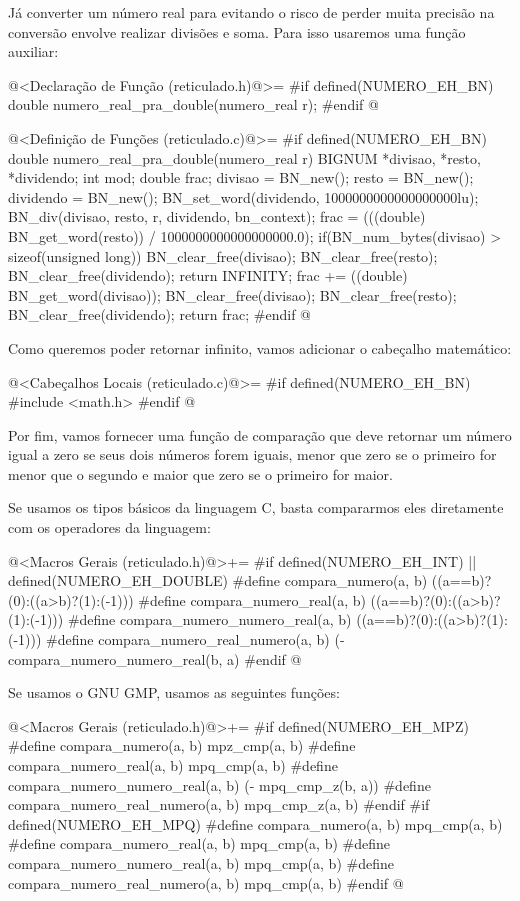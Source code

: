 Já converter um número real para  evitando o risco
de perder muita precisão na conversão envolve realizar divisões e
soma. Para isso usaremos uma função auxiliar:

\iniciocodigo
@<Declaração de Função (reticulado.h)@>=
#if defined(NUMERO_EH_BN)
double numero_real_pra_double(numero_real r);
#endif
@
\fimcodigo

\iniciocodigo
@<Definição de Funções (reticulado.c)@>=
#if defined(NUMERO_EH_BN)
double numero_real_pra_double(numero_real r){
  BIGNUM *divisao, *resto, *dividendo;
  int mod;
  double frac;
  divisao = BN_new();
  resto = BN_new();
  dividendo = BN_new();
  BN_set_word(dividendo, 1000000000000000000lu);  
  BN_div(divisao, resto, r, dividendo, bn_context);
  frac = (((double) BN_get_word(resto)) / 1000000000000000000.0);
  if(BN_num_bytes(divisao) > sizeof(unsigned long)){
    BN_clear_free(divisao);
    BN_clear_free(resto);
    BN_clear_free(dividendo);
    return INFINITY;
  }
  frac += ((double) BN_get_word(divisao));
  BN_clear_free(divisao);
  BN_clear_free(resto);
  BN_clear_free(dividendo);
  return frac;  
}
#endif
@

Como queremos poder retornar infinito, vamos adicionar o cabeçalho
matemático:

\iniciocodigo
@<Cabeçalhos Locais (reticulado.c)@>=
#if defined(NUMERO_EH_BN)
#include <math.h>
#endif
@
\fimcodigo

Por fim, vamos fornecer uma função de comparação que deve retornar um
número igual a zero se seus dois números forem iguais, menor que zero
se o primeiro for menor que o segundo e maior que zero se o primeiro
for maior.

Se usamos os tipos básicos da linguagem C, basta compararmos eles
diretamente com os operadores da linguagem:

\iniciocodigo
@<Macros Gerais (reticulado.h)@>+=
#if defined(NUMERO_EH_INT) || defined(NUMERO_EH_DOUBLE)
#define compara_numero(a, b) ((a==b)?(0):((a>b)?(1):(-1)))
#define compara_numero_real(a, b) ((a==b)?(0):((a>b)?(1):(-1)))
#define compara_numero_numero_real(a, b) ((a==b)?(0):((a>b)?(1):(-1)))
#define compara_numero_real_numero(a, b) (-compara_numero_numero_real(b, a)
#endif
@
\fimcodigo

Se usamos o GNU GMP, usamos as seguintes funções:

\iniciocodigo
@<Macros Gerais (reticulado.h)@>+=
#if defined(NUMERO_EH_MPZ)
#define compara_numero(a, b) mpz_cmp(a, b)
#define compara_numero_real(a, b) mpq_cmp(a, b)
#define compara_numero_numero_real(a, b) (- mpq_cmp_z(b, a))
#define compara_numero_real_numero(a, b) mpq_cmp_z(a, b)
#endif
#if defined(NUMERO_EH_MPQ)
#define compara_numero(a, b) mpq_cmp(a, b)
#define compara_numero_real(a, b) mpq_cmp(a, b)
#define compara_numero_numero_real(a, b) mpq_cmp(a, b)
#define compara_numero_real_numero(a, b) mpq_cmp(a, b)
#endif
@
\fimcodigo

